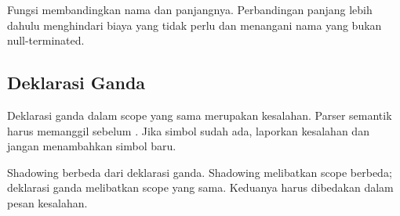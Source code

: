 
Fungsi  membandingkan nama dan panjangnya.
Perbandingan panjang lebih dahulu menghindari biaya
 yang tidak perlu dan menangani nama yang bukan
null-terminated.

\subsection{Deklarasi Ganda}

Deklarasi ganda dalam scope yang sama merupakan kesalahan. Parser
semantik harus memanggil  sebelum
. Jika simbol sudah ada, laporkan kesalahan dan jangan
menambahkan simbol baru.

\begin{infobox}
Shadowing berbeda dari deklarasi ganda. Shadowing melibatkan scope
berbeda; deklarasi ganda melibatkan scope yang sama. Keduanya harus
dibedakan dalam pesan kesalahan.
\end{infobox}
